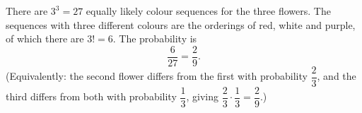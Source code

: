 There are $3^3=27$ equally likely colour sequences for the three flowers. The sequences with three different colours are the orderings of red, white and purple, of which there are $3!=6$. The probability is
\[
\dfrac{6}{27}=\boxed{\dfrac{2}{9}}.
\]
(Equivalently: the second flower differs from the first with probability $\dfrac{2}{3}$, and the third differs from both with probability $\dfrac{1}{3}$, giving $\dfrac{2}{3}\cdot\dfrac{1}{3}=\dfrac{2}{9}$.)
